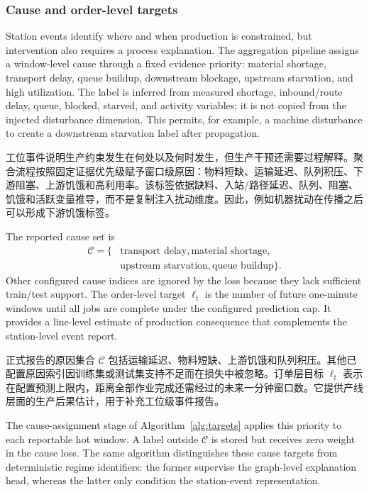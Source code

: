\documentclass[a4paper,fleqn]{cas-dc}
\newcommand{\zhpara}[1]{%
  \par\begingroup\small\color{black!72}\noindent #1\par\endgroup}
\begin{document}
\subsubsection{Cause and order-level targets}

Station events identify where and when production is constrained, but intervention also requires a process explanation. The aggregation pipeline assigns a window-level cause through a fixed evidence priority: material shortage, transport delay, queue buildup, downstream blockage, upstream starvation, and high utilization. The label is inferred from measured shortage, inbound/route delay, queue, blocked, starved, and activity variables; it is not copied from the injected disturbance dimension. This permits, for example, a machine disturbance to create a downstream starvation label after propagation.

\zhpara{工位事件说明生产约束发生在何处以及何时发生，但生产干预还需要过程解释。聚合流程按照固定证据优先级赋予窗口级原因：物料短缺、运输延迟、队列积压、下游阻塞、上游饥饿和高利用率。该标签依据缺料、入站/路径延迟、队列、阻塞、饥饿和活跃变量推导，而不是复制注入扰动维度。因此，例如机器扰动在传播之后可以形成下游饥饿标签。}

The reported cause set is
\begin{equation}
\begin{aligned}
\mathcal{C}=\{&
\text{transport delay},\text{material shortage},\\
&\text{upstream starvation},\text{queue buildup}\}.
\end{aligned}
\end{equation}
Other configured cause indices are ignored by the loss because they lack sufficient train/test support. The order-level target $\ell_t$ is the number of future one-minute windows until all jobs are complete under the configured prediction cap. It provides a line-level estimate of production consequence that complements the station-level event report.

\zhpara{正式报告的原因集合 $\mathcal{C}$ 包括运输延迟、物料短缺、上游饥饿和队列积压。其他已配置原因索引因训练集或测试集支持不足而在损失中被忽略。订单层目标 $\ell_t$ 表示在配置预测上限内，距离全部作业完成还需经过的未来一分钟窗口数。它提供产线层面的生产后果估计，用于补充工位级事件报告。}

The cause-assignment stage of Algorithm~\ref{alg:targets} applies this priority to each reportable hot window. A label outside $\mathcal{C}$ is stored but receives zero weight in the cause loss. The same algorithm distinguishes these cause targets from deterministic regime identifiers: the former supervise the graph-level explanation head, whereas the latter only condition the station-event representation.
\end{document}
